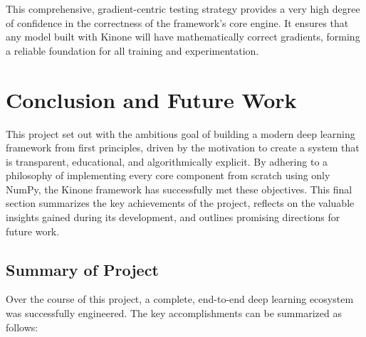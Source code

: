 \documentclass[a4paper]{article}
\begin{document}
This comprehensive, gradient-centric testing strategy provides a very high degree of confidence in the correctness of the framework's core engine. It ensures that any model built with Kinone will have mathematically correct gradients, forming a reliable foundation for all training and experimentation.

\section{Conclusion and Future Work}

This project set out with the ambitious goal of building a modern deep learning framework from first principles, driven by the motivation to create a system that is transparent, educational, and algorithmically explicit. By adhering to a philosophy of implementing every core component from scratch using only NumPy, the Kinone framework has successfully met these objectives. This final section summarizes the key achievements of the project, reflects on the valuable insights gained during its development, and outlines promising directions for future work.

\subsection{Summary of Project}

Over the course of this project, a complete, end-to-end deep learning ecosystem was successfully engineered. The key accomplishments can be summarized as follows:
\end{document}
